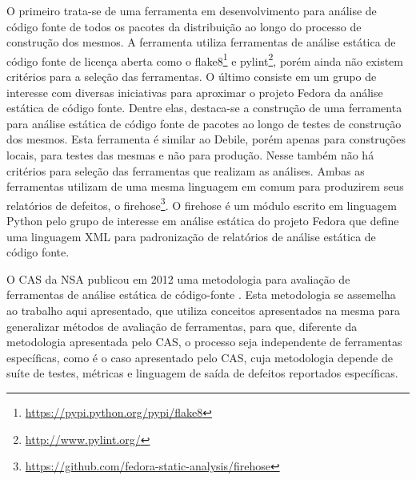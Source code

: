   O primeiro trata-se de uma ferramenta em desenvolvimento para análise de código fonte de todos os pacotes da distribuição ao longo do processo de construção dos mesmos. A ferramenta utiliza ferramentas de análise estática de código fonte de licença aberta como o flake8\footnote{\url{https://pypi.python.org/pypi/flake8}} e pylint\footnote{\url{http://www.pylint.org/}}, porém ainda não existem critérios para a seleção das ferramentas. O último consiste em um grupo de interesse com diversas iniciativas para aproximar o projeto Fedora da análise estática de código fonte. Dentre elas, destaca-se a construção de uma ferramenta para análise estática de código fonte de pacotes ao longo de testes de construção dos mesmos. Esta ferramenta é similar ao Debile, porém  apenas para construções locais, para testes das mesmas e não para produção. Nesse também não há critérios para seleção das ferramentas que realizam as análises. Ambas as ferramentas utilizam de uma mesma linguagem em comum para produzirem seus relatórios de defeitos, o firehose\footnote{\url{https://github.com/fedora-static-analysis/firehose}}. O firehose é um módulo escrito em linguagem Python pelo grupo de interesse em análise estática do projeto Fedora que define uma linguagem XML para padronização de relatórios de análise estática de código fonte.

  O CAS da NSA publicou em 2012 uma metodologia para avaliação de ferramentas de análise estática de código-fonte \cite{nsa}. Esta metodologia se assemelha ao trabalho aqui apresentado, que utiliza conceitos apresentados na mesma para generalizar métodos de avaliação de ferramentas, para que, diferente da metodologia apresentada pelo CAS, o processo seja independente de ferramentas específicas, como é o caso apresentado pelo CAS, cuja metodologia depende de suíte de testes, métricas e linguagem de saída de defeitos reportados específicas.

